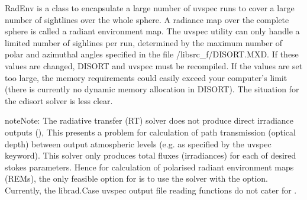 \documentclass[a4paper,10pt,english]{sphinxmanual}
\begin{document}
\begin{fulllineitems}
\label{packages:librad.RadEnv}
RadEnv is a class to encapsulate a large number of uvspec runs to cover a large number of sightlines over the
whole sphere. A radiance map over the complete sphere is called a radiant environment map. The uvspec utility can
only handle a limited number of sighlines per run, determined by the maximum number of polar and azimuthal angles
specified in the file /libsrc\_f/DISORT.MXD. If these values are changed, DISORT and uvspec must be recompiled. If
the values are set too large, the memory requirements could easily exceed your computer's limit (there is
currently no dynamic memory allocation in DISORT). The situation for the cdisort solver is less clear.

\begin{notice}{note}{Note:}
The  radiative transfer (RT) solver does not produce direct irradiance outputs (),
This presents a problem for calculation of path transmission (optical depth) between output atmospheric
levels (e.g. as specified by the uvspec  keyword). This solver only produces total fluxes (irradiances)
for each of desired stokes parameters. Hence for calculation of polarised radiant environment maps (REMs), the only
feasible option for  is to use the  solver with the  option. Currently,
the librad.Case uvspec output file reading functions do not cater for .
\end{notice}


\end{fulllineitems}
\end{document}
